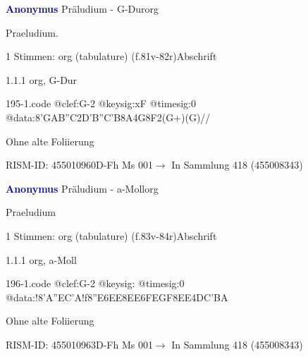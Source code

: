\documentclass[twocolumn, 12pt]{book}
\begin{document}
\par \vspace{16pt} \textcolor{darkblue}{\textbf{Anonymus  }}\hfillplus{\textbf{[195]}}\newline Präludium - G-Dur\newline org
\par \begin{itshape}[f.81v, at left:] Praeludium.\end{itshape} 
\par \textcolor{darkblue}{}  1 Stimmen: org (tabulature)  (f.81v-82r)\newline Abschrift
\par 1.1.1  org, G-Dur  
\begin{filecontents*}{195-1.code}
@clef:G-2
@keysig:xF
@timesig:0
@data:{8'GAB''C}2D'B''C'B8A4G8F2(G+)(G)//
\end{filecontents*}
\newline %
\par Ohne alte Foliierung
\par RISM-ID: 455010960\newline D-Fh  Ms 001\newline $\rightarrow$ In Sammlung 418 (455008343)
      
\par \vspace{16pt} \textcolor{darkblue}{\textbf{Anonymus  }}\hfillplus{\textbf{[196]}}\newline Präludium - a-Moll\newline org
\par \begin{itshape}[f.83v, at left:] Praeludium\end{itshape} 
\par \textcolor{darkblue}{}  1 Stimmen: org (tabulature)  (f.83v-84r)\newline Abschrift
\par 1.1.1  org, a-Moll  
\begin{filecontents*}{196-1.code}
@clef:G-2
@keysig:
@timesig:0
@data:!{8'A''EC'A}!f{8''E6EE}{8EE}{6FEGF}{8EE}4DC'BA
\end{filecontents*}
\newline %
\par Ohne alte Foliierung
\par RISM-ID: 455010963\newline D-Fh  Ms 001\newline $\rightarrow$ In Sammlung 418 (455008343)
      
\end{document}
